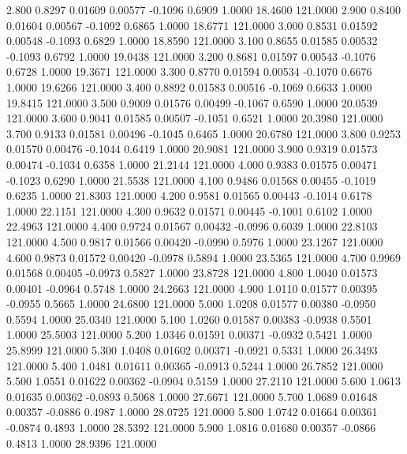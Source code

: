    2.800   0.8297   0.01609   0.00577  -0.1096   0.6909   1.0000  18.4600 121.0000
   2.900   0.8400   0.01604   0.00567  -0.1092   0.6865   1.0000  18.6771 121.0000
   3.000   0.8531   0.01592   0.00548  -0.1093   0.6829   1.0000  18.8590 121.0000
   3.100   0.8655   0.01585   0.00532  -0.1093   0.6792   1.0000  19.0438 121.0000
   3.200   0.8681   0.01597   0.00543  -0.1076   0.6728   1.0000  19.3671 121.0000
   3.300   0.8770   0.01594   0.00534  -0.1070   0.6676   1.0000  19.6266 121.0000
   3.400   0.8892   0.01583   0.00516  -0.1069   0.6633   1.0000  19.8415 121.0000
   3.500   0.9009   0.01576   0.00499  -0.1067   0.6590   1.0000  20.0539 121.0000
   3.600   0.9041   0.01585   0.00507  -0.1051   0.6521   1.0000  20.3980 121.0000
   3.700   0.9133   0.01581   0.00496  -0.1045   0.6465   1.0000  20.6780 121.0000
   3.800   0.9253   0.01570   0.00476  -0.1044   0.6419   1.0000  20.9081 121.0000
   3.900   0.9319   0.01573   0.00474  -0.1034   0.6358   1.0000  21.2144 121.0000
   4.000   0.9383   0.01575   0.00471  -0.1023   0.6290   1.0000  21.5538 121.0000
   4.100   0.9486   0.01568   0.00455  -0.1019   0.6235   1.0000  21.8303 121.0000
   4.200   0.9581   0.01565   0.00443  -0.1014   0.6178   1.0000  22.1151 121.0000
   4.300   0.9632   0.01571   0.00445  -0.1001   0.6102   1.0000  22.4963 121.0000
   4.400   0.9724   0.01567   0.00432  -0.0996   0.6039   1.0000  22.8103 121.0000
   4.500   0.9817   0.01566   0.00420  -0.0990   0.5976   1.0000  23.1267 121.0000
   4.600   0.9873   0.01572   0.00420  -0.0978   0.5894   1.0000  23.5365 121.0000
   4.700   0.9969   0.01568   0.00405  -0.0973   0.5827   1.0000  23.8728 121.0000
   4.800   1.0040   0.01573   0.00401  -0.0964   0.5748   1.0000  24.2663 121.0000
   4.900   1.0110   0.01577   0.00395  -0.0955   0.5665   1.0000  24.6800 121.0000
   5.000   1.0208   0.01577   0.00380  -0.0950   0.5594   1.0000  25.0340 121.0000
   5.100   1.0260   0.01587   0.00383  -0.0938   0.5501   1.0000  25.5003 121.0000
   5.200   1.0346   0.01591   0.00371  -0.0932   0.5421   1.0000  25.8999 121.0000
   5.300   1.0408   0.01602   0.00371  -0.0921   0.5331   1.0000  26.3493 121.0000
   5.400   1.0481   0.01611   0.00365  -0.0913   0.5244   1.0000  26.7852 121.0000
   5.500   1.0551   0.01622   0.00362  -0.0904   0.5159   1.0000  27.2110 121.0000
   5.600   1.0613   0.01635   0.00362  -0.0893   0.5068   1.0000  27.6671 121.0000
   5.700   1.0689   0.01648   0.00357  -0.0886   0.4987   1.0000  28.0725 121.0000
   5.800   1.0742   0.01664   0.00361  -0.0874   0.4893   1.0000  28.5392 121.0000
   5.900   1.0816   0.01680   0.00357  -0.0866   0.4813   1.0000  28.9396 121.0000
